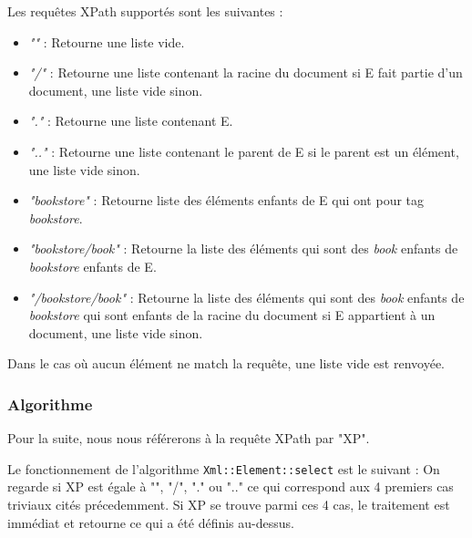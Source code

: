     Les requêtes XPath supportés sont les suivantes :
    \begin{itemize}
        \item \textit{""} : Retourne une liste vide.
        \item \textit{"/"} : Retourne une liste contenant la racine du document si E fait partie d'un document, une liste vide sinon.
        \item \textit{"."} : Retourne une liste contenant E.
        \item \textit{".."} : Retourne une liste contenant le parent de E si le parent est un élément, une liste vide sinon.
        \item \textit{"bookstore"} : Retourne liste des éléments enfants de E qui ont pour tag \textit{bookstore}.
        \item \textit{"bookstore/book"} : Retourne la liste des éléments qui sont des \textit{book} enfants de \textit{bookstore} enfants de E.
        \item \textit{"/bookstore/book"} : Retourne la liste des éléments qui sont des \textit{book} enfants de \textit{bookstore} qui sont enfants de la racine du document si E appartient à un document, une liste vide sinon.
        \\
    \end{itemize}

    Dans le cas où aucun élément ne match la requête, une liste vide est renvoyée.

    \subsubsection{Algorithme}

    Pour la suite, nous nous référerons à la requête XPath par "XP".

    Le fonctionnement de l'algorithme \lstinline$Xml::Element::select$ est le suivant :
    On regarde si XP est égale à "", "/", "." ou ".." ce qui correspond aux 4 premiers cas triviaux cités précedemment.
    Si XP se trouve parmi ces 4 cas, le traitement est immédiat et retourne ce qui a été définis au-dessus.


